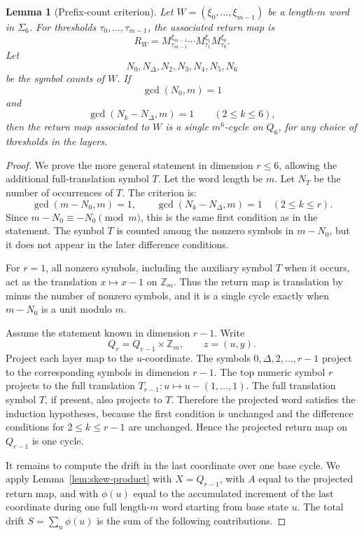 \documentclass[10pt,a4paper]{amsart}
\newtheorem{lemma}{Lemma}
\begin{document}
\begin{lemma}[Prefix-count criterion]\label{lem:count-criterion}
Let \(W=(\xi_0,\ldots,\xi_{m-1})\) be a length-\(m\) word in \(\Sigma_6\).  For thresholds \(\tau_0,\ldots,\tau_{m-1}\), the associated return map is
\[
R_W=M_{\tau_{m-1}}^{\xi_{m-1}}\cdots M_{\tau_1}^{\xi_1}M_{\tau_0}^{\xi_0}.
\]
Let
\[
N_0,N_\Delta,N_2,N_3,N_4,N_5,N_6
\]
be the symbol counts of \(W\).  If
\[
\gcd(N_0,m)=1
\]
and
\[
\gcd(N_k-N_\Delta,m)=1\qquad(2\le k\le6),
\]
then the return map associated to \(W\) is a single \(m^6\)-cycle on \(Q_6\), for any choice of
thresholds in the layers.
\end{lemma}

\begin{proof}
We prove the more general statement in dimension \(r\le6\), allowing the additional full-translation
symbol \(T\).  Let the word length be \(m\).  Let \(N_T\) be the number of occurrences of \(T\).  The
criterion is:
\[
\gcd(m-N_0,m)=1,
\qquad
\gcd(N_k-N_\Delta,m)=1\quad(2\le k\le r).
\]
Since \(m-N_0\equiv -N_0\pmod m\), this is the same first condition as in the statement.  The symbol
\(T\) is counted among the nonzero symbols in \(m-N_0\), but it does not appear in the later
difference conditions.

For \(r=1\), all nonzero symbols, including the auxiliary symbol \(T\) when it occurs, act as the translation \(x\mapsto x-1\) on \(\mathbb Z_m\).  Thus the
return map is translation by minus the number of nonzero symbols, and it is a single cycle exactly when
\(m-N_0\) is a unit modulo \(m\).

Assume the statement known in dimension \(r-1\).  Write
\[
Q_r=Q_{r-1}\times\mathbb Z_m,
\qquad z=(u,y).
\]
Project each layer map to the \(u\)-coordinate.  The symbols \(0,\Delta,2,\ldots,r-1\) project to the
corresponding symbols in dimension \(r-1\).  The top numeric symbol \(r\) projects to the full
translation \(T_{r-1}:u\mapsto u-(1,\ldots,1)\).  The full translation symbol \(T\), if present, also projects to
\(T\).  Therefore the projected word satisfies the induction hypotheses, because the first condition is
unchanged and the difference conditions for \(2\le k\le r-1\) are unchanged.  Hence the projected
return map on \(Q_{r-1}\) is one cycle.

It remains to compute the drift in the last coordinate over one base cycle.  We apply Lemma~\ref{lem:skew-product} with \(X=Q_{r-1}\), with \(A\) equal to the projected return map, and with \(\phi(u)\) equal to the accumulated increment of the last coordinate during one full length-\(m\) word starting from base state \(u\).  The total drift \(S=\sum_u\phi(u)\) is the sum of the following contributions.


\end{proof}
\end{document}
